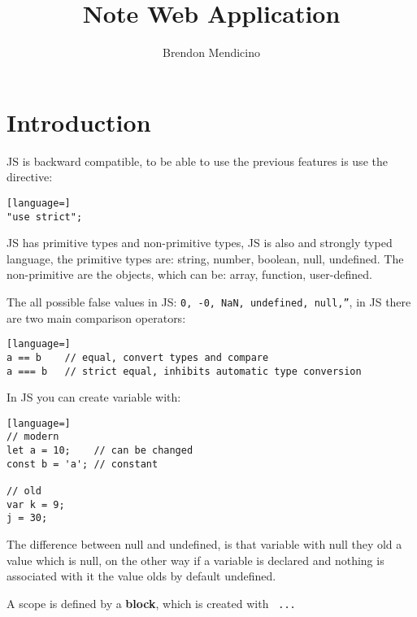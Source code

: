 \documentclass[12pt]{article}
\title{Note Web Application}
\author{Brendon Mendicino}
\begin{document}
\maketitle
\newpage
\tableofcontents
\newpage



\section{ Introduction}
JS is backward compatible, to be able to use the previous features is use the directive:
\begin{lstlisting}[language=]
"use strict";
\end{lstlisting}
JS has primitive types and non-primitive types, JS is also and strongly typed language, the primitive types are: string, number, boolean, null, undefined. The non-primitive are the objects, which can be: array, function, user-defined.

The all possible false values in JS: \texttt{0, -0, NaN, undefined, null,''}, in JS there are two main comparison operators:
\begin{lstlisting}[language=]
a == b    // equal, convert types and compare
a === b   // strict equal, inhibits automatic type conversion
\end{lstlisting}
In JS you can create variable with:
\begin{lstlisting}[language=]
// modern
let a = 10;    // can be changed
const b = 'a'; // constant

// old
var k = 9;
j = 30;
\end{lstlisting}
The difference between null and undefined, is that variable with null they old a value which is null, on the other way if a variable is declared and nothing is associated with it the value olds by default undefined.

A scope is defined by a \textbf{block}, which is created with \texttt{{ ... }}
\end{document}
